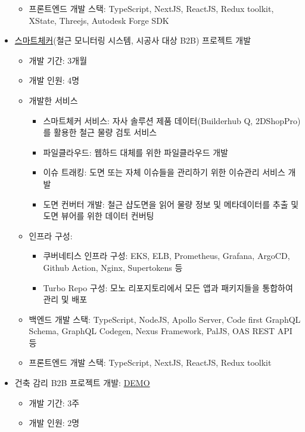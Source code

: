\begin{itemize}
\begin{itemize}[label=$\star$]
		      \item 프론트엔드 개발 스택: TypeScript, NextJS, ReactJS, Redux toolkit, XState, Threejs, Autodesk Forge SDK
	      \end{itemize}
	\item \href{https://check.builderhub.io/signin}{스마트체커}(철근 모니터링 시스템, 시공사 대상 B2B) 프로젝트 개발
	      \begin{itemize}[label=$\star$]
		      \item 개발 기간: 3개월
		      \item 개발 인원: 4명
		      \item 개발한 서비스
		            \begin{itemize}
			            \item 스마트체커 서비스: 자사 솔루션 제품 데이터(Builderhub Q, 2DShopPro)를 활용한 철근 물량 검토 서비스
			            \item 파일클라우드: 웹하드 대체를 위한 파일클라우드 개발
			            \item 이슈 트래킹: 도면 또는 자체 이슈들을 관리하기 위한 이슈관리 서비스 개발
			            \item 도면 컨버터 개발: 철근 샵도면을 읽어 물량 정보 및 메타데이터를 추출 및 도면 뷰어를 위한 데이터 컨버팅
		            \end{itemize}
		      \item 인프라 구성:
		            \begin{itemize}
			            \item 쿠버네티스 인프라 구성: EKS, ELB, Prometheus, Grafana, ArgoCD, Github Action, Nginx, Supertokens 등
			            \item Turbo Repo 구성: 모노 리포지토리에서 모든 앱과 패키지들을 통합하여 관리 및 배포
		            \end{itemize}
		      \item 백엔드 개발 스택: TypeScript, NodeJS, Apollo Server, Code first GraphQL Schema, GraphQL Codegen, Nexus Framework, PalJS, OAS REST API 등
		      \item 프론트엔드 개발 스택: TypeScript, NextJS, ReactJS, Redux toolkit
	      \end{itemize}
	\item 건축 감리 B2B 프로젝트 개발: \href{https://asec.builderhub.io/dashboard/detail/initial/supervision}{DEMO}
	      \begin{itemize}[label=$\star$]
		      \item 개발 기간: 3주
		      \item 개발 인원: 2명

\end{itemize}
\end{itemize}
